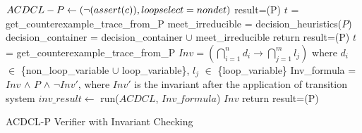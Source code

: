 \documentclass[a4paper,conference]{llncs}
\begin{document}
\begin{algorithm2e}[t]
\DontPrintSemicolon
{}
\begin{small}
$ACDCL-P \leftarrow (\neg(assert(c)),loopselect=nondet)$ \;
result=\deduce(P)\;
 {
  \return \safe \;
}
\uElse
{
  $t$ = get\_counterexample\_trace\_from\_P \;
   {
    \return \unsafe \;
  }
}
{
   meet\_irreducible = decision\_heuristics($P$)\;
   decision\_container = decision\_container $\cup$ meet\_irreducible \; 
  {
    return \unknown\; 
  }
  \uElse
  {
    result=\deduce(P)\;
    {
      $t$ = get\_counterexample\_trace\_from\_P \;
       {
        \return \unsafe \;
      }
      \uElse 
      {
        \continue\;
      }
    }
    \uElse
    {
       {
         {
              $Inv=(\bigcap_{i=1}^{n} d_{i} \rightarrow
              \bigcap_{j=1}^{m} l_{j})$ where $d_i$ $\in$ \{non\_loop\_variable 
            $\cup$ loop\_variable\}, $l_j$ $\in$ \{loop\_variable\} \;
             Inv\_formula = $Inv$ $\wedge$ $P$ $\wedge$ $\neg{Inv'}$, where $Inv'$
            is the invariant after the application of transition system\;
        $inv\_result \leftarrow$ run($ACDCL$, $Inv\_formula$) \; 
         {
          \learn $Inv$ \;
        }
        }
         {
          return \safe \;  
        }
        result=\deduce(P)\;
      }
    }
  }
}
\end{small}
\caption{ACDCL-P Verifier with Invariant Checking\label{Alg:verifox}}
\end{algorithm2e}
\end{document}
